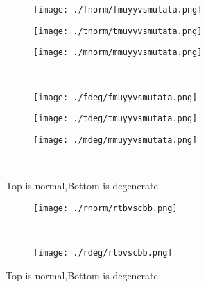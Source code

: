 \documentclass[aps,floats,floatfix,nofootinbib]{revtex4-1}
\begin{document}
\begin{center}
\begin{figure}
\begin{subfigure}{0.3\textwidth}
\texttt{[image: ./fnorm/fmuyyvsmutata.png]}
\label{}
\end{subfigure}
\begin{subfigure}{0.3\textwidth}
\texttt{[image: ./tnorm/tmuyyvsmutata.png]}
\label{}
\end{subfigure}
\begin{subfigure}{0.3\textwidth}
\texttt{[image: ./mnorm/mmuyyvsmutata.png]}
\label{}
\end{subfigure}\\
\begin{subfigure}{0.3\textwidth}
\texttt{[image: ./fdeg/fmuyyvsmutata.png]}
\label{}
\end{subfigure}
\begin{subfigure}{0.3\textwidth}
\texttt{[image: ./tdeg/tmuyyvsmutata.png]}
\label{}
\end{subfigure}
\begin{subfigure}{0.3\textwidth}
\texttt{[image: ./mdeg/mmuyyvsmutata.png]}
\label{}
\end{subfigure}\\
\caption{Top is normal,Bottom is degenerate}
\end{figure}
\end{center}

\begin{center}
\begin{figure}
\begin{subfigure}{1.0\textwidth}
\texttt{[image: ./rnorm/rtbvscbb.png]}
\label{}
\end{subfigure}\\
\begin{subfigure}{1.0\textwidth}
\texttt{[image: ./rdeg/rtbvscbb.png]}
\label{}
\end{subfigure}
\caption{Top is normal,Bottom is degenerate}
\end{figure}
\end{center}
\end{document}
